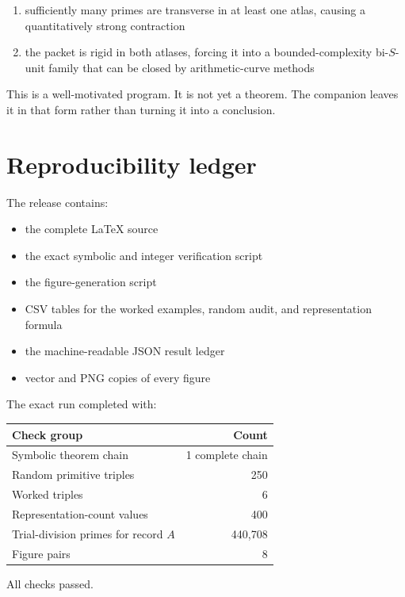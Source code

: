 \documentclass[11pt]{article}
\begin{document}
\begin{enumerate}
  \item sufficiently many primes are transverse in at least one atlas, causing a quantitatively strong contraction
  \item the packet is rigid in both atlases, forcing it into a bounded-complexity bi-$S$-unit family that can be closed by arithmetic-curve methods
\end{enumerate}

This is a well-motivated program.  It is not yet a theorem.  The companion leaves it in that form rather than turning it into a conclusion.

\section{Reproducibility ledger}

The release contains:

\begin{itemize}
  \item the complete LaTeX source
  \item the exact symbolic and integer verification script
  \item the figure-generation script
  \item CSV tables for the worked examples, random audit, and representation formula
  \item the machine-readable JSON result ledger
  \item vector and PNG copies of every figure
\end{itemize}

The exact run completed with:

\begin{center}
\begin{tabular}{lr}
\toprule
Check group & Count\\
\midrule
Symbolic theorem chain & 1 complete chain\\
Random primitive triples & 250\\
Worked triples & 6\\
Representation-count values & 400\\
Trial-division primes for record $A$ & 440{,}708\\
Figure pairs & 8\\
\bottomrule
\end{tabular}
\end{center}

All checks passed.
\end{document}
